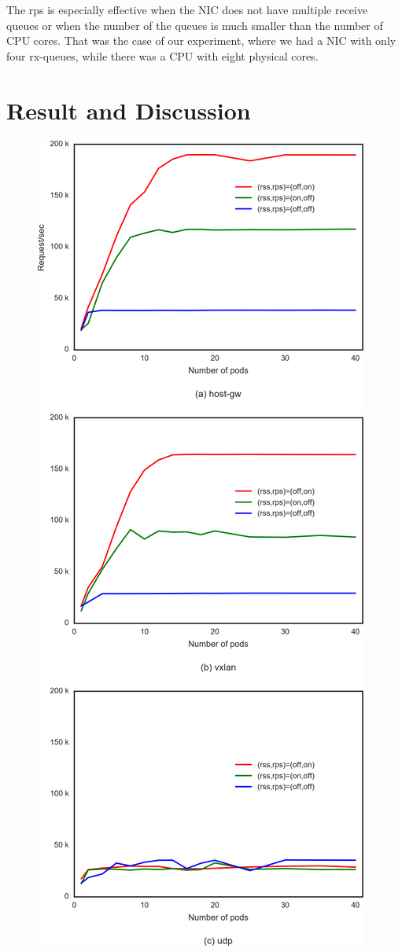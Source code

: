 The rps is especially effective when the NIC does not have multiple receive queues or when the number of the queues is 
much smaller than the number of CPU cores. 
That was the case of our experiment, where we had a NIC with only four rx-queues, 
while there was a CPU with eight physical cores.

\section{Result and Discussion}\label{Result and Discussion}

\begin{figure}
\includegraphics[width=\columnwidth]{Figs/ipvs_3figs}

\end{figure}
